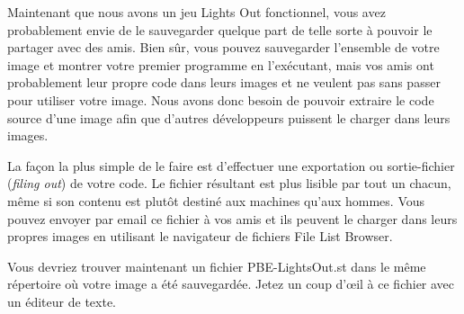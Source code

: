 \documentclass[a4paper,10pt,twoside]{book}
\begin{document}
Maintenant que nous avons un jeu Lights Out fonctionnel, vous avez
probablement envie de le sauvegarder quelque part de telle sorte à
pouvoir le partager avec des amis. Bien sûr, vous pouvez sauvegarder
l'ensemble de votre image \pharo et montrer votre premier programme
en l'exécutant, mais vos amis ont probablement leur propre code dans
leurs images et ne veulent pas sans passer pour utiliser votre image.
Nous avons donc besoin de pouvoir extraire le code source d'une image
\pharo afin que d'autres développeurs puissent le charger dans leurs images.

La façon la plus simple de le faire est d'effectuer une exportation ou
sortie-fichier (\emph{filing out}) de votre code.  %
Le fichier résultant est plus lisible par tout un chacun, même si son
contenu est plutôt destiné aux machines qu'aux hommes.
Vous pouvez envoyer par email ce fichier à vos amis et ils peuvent le
charger dans leurs propres images \pharo en utilisant le navigateur
de fichiers File List Browser.

Vous devriez trouver maintenant un fichier PBE-LightsOut.st dans le même
répertoire où votre image a été sauvegardée.
Jetez un coup d'\oe il à ce fichier avec un éditeur de texte.



\end{document}
